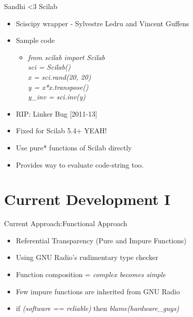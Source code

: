 \documentclass{beamer}
\begin{document}
\begin{frame}{Sandhi \textless3 Scilab}

\begin{itemize}
  \item Sciscipy wrapper - Sylvestre Ledru and Vincent Guffens
  \item Sample code
  \begin{itemize}\item \textit{from scilab import Scilab 
                \\  sci = Scilab()
                \\  x = sci.rand(20, 20)
                \\  y = x*x.transpose()
                \\  y\_inv = sci.inv(y)}
  \end{itemize}
  \item RIP: Linker Bug [2011-13]
  \item Fixed for Scilab 5.4+  YEAH!
  \item Use pure* functions of Scilab directly
  \item Provides way to evaluate code-string too.
\end{itemize}
\vskip 1cm
\end{frame}


\section{Current Development I}
\begin{frame}{Current Approach:Functional Approach}

\begin{itemize}
  \item Referential Transparency (Pure and Impure Functions)
  \item Using GNU Radio's rudimentary type checker
  \item Function composition = \textit{complex becomes simple}
  \item Few impure functions are inherited from GNU Radio
  \item if \textit{(software == reliable)} then \textit{blame(hardware\_guys)}
\end{itemize}
\vskip 1cm
\end{frame}

\end{document}
